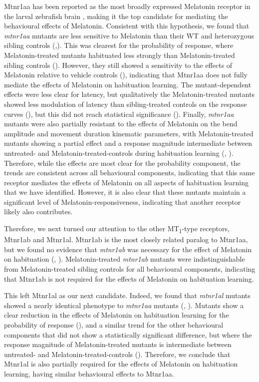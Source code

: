 \documentclass[9.5pt]{RandlettLab_elife}            %
\begin{document}
Mtnr1aa has been reported as the most broadly expressed Melatonin receptor in the larval zebrafish brain \citep{Hill2026}, making it the top candidate for mediating the behavioural effects of Melatonin. 
Consistent with this hypothesis, we found that \emph{mtnr1aa} mutants are less sensitive to Melatonin than their WT and heterozygous sibling controls (,). 
This was clearest for the probability of response, where Melatonin-treated mutants habituated less strongly than Melatonin-treated sibling controls ().
However, they still showed a sensitivity to the effects of Melatonin relative to vehicle controls (), indicating that Mtnr1aa does not fully mediate the effects of Melatonin on habituation learning.
The mutant-dependent effects were less clear for latency, but qualitatively the Melatonin-treated mutants showed less modulation of latency than sibling-treated controls on the response curves (), but this did not reach statistical significance (). 
Finally, \emph{mtnr1aa} mutants were also partially resistant to the effects of Melatonin on the bend amplitude and movement duration kinematic parameters, with Melatonin-treated mutants showing a partial effect and a response magnitude intermediate between untreated- and Melatonin-treated-controls during habituation learning (, ). 
Therefore, while the effects are most clear for the probability component, the trends are consistent across all behavioural components, indicating that this same receptor mediates the effects of Melatonin on all aspects of habituation learning that we have identified.
However, it is also clear that these mutants maintain a significant level of Melatonin-responsiveness, indicating that another receptor likely also contributes. 

Therefore, we next turned our attention to the other MT\textsubscript{1}-type receptors, Mtnr1ab and Mtnr1al.
Mtnr1ab is the most closely related paralog to Mtnr1aa, but we found no evidence that \emph{mtnr1ab} was necessary for the effect of Melatonin on habituation (, ). 
Melatonin-treated \emph{mtnr1ab} mutants were indistinguishable from Melatonin-treated sibling controls for all behavioural components, indicating that Mtnr1ab is not required for the effects of Melatonin on habituation learning.

This left Mtnr1al as our next candidate. Indeed, we found that \emph{mtnr1al} mutants showed a nearly identical phenotype to \emph{mtnr1aa} mutants (, ). 
Mutants show a clear reduction in the effects of Melatonin on habituation learning for the probability of response (), and a similar trend for the other behavioural components that did not show a statistically significant difference, but where the response magnitude of Melatonin-treated mutants is intermediate between untreated- and Melatonin-treated-controls (). Therefore, we conclude that Mtnr1al is also partially required for the effects of Melatonin on habituation learning, having similar behavioural effects to Mtnr1aa.
\end{document}

